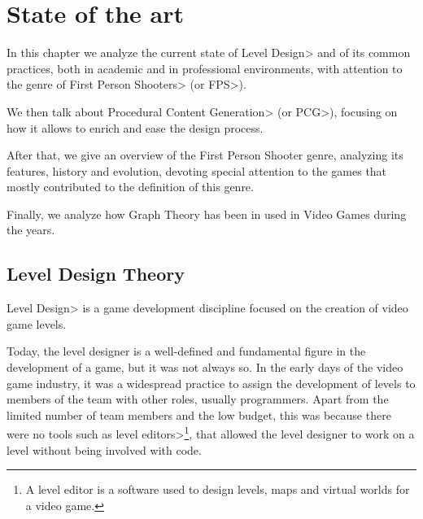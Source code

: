 \chapter{State of the art}


In this chapter we analyze the current state of \<Level Design> and of its common practices, both in academic and in professional environments, with attention to the genre of \<First Person Shooters> (or \<FPS>).

\par

We then talk about \<Procedural Content Generation> (or \<PCG>), focusing on how it allows to enrich and ease the design process.

\par

After that, we give an overview of the First Person Shooter genre, analyzing its features, history and evolution, devoting special attention to the games that mostly contributed to the definition of this genre.

\par

Finally, we analyze how Graph Theory has been in used in Video Games during the years.


\section{Level Design Theory}

\<Level Design> is a game development discipline focused on the creation of video game levels.

\par

Today, the level designer is a well-defined and fundamental figure in the development of a game, but it was not always so. In the early days of the video game industry, it was a widespread practice to assign the development of levels to members of the team with other roles, usually programmers. Apart from the limited number of team members and the low budget, this was because there were no tools such as \<level editors>\footnote{\label{levelEditorFootnote}A level editor is a software used to design levels, maps and virtual worlds for a video game.}, that allowed the level designer to work on a level without being involved with code.

\par

